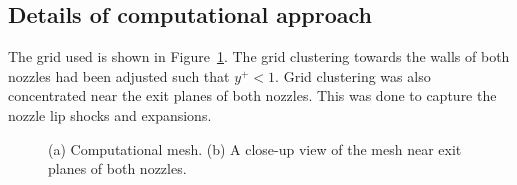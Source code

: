 \subsection{Details of computational approach}
%
The grid used is shown in Figure~\ref{figure-coaxial-jets-grid}. The 
grid clustering towards the walls of both nozzles had been adjusted 
such that $y^+<1$. Grid clustering was also concentrated near the 
exit planes of both nozzles. This was done to capture the nozzle
lip shocks and expansions.
%
\begin{figure}[h]
 \centering
 \caption{(a) Computational mesh. (b) A close-up view of
          the mesh near exit planes of both nozzles.}
 \label{figure-coaxial-jets-grid}
\end{figure}
